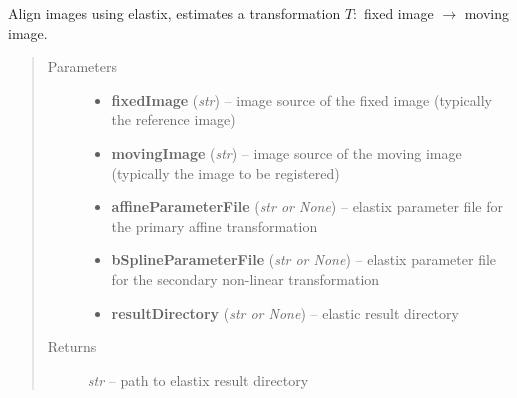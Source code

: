 \documentclass[letterpaper,10pt,english]{sphinxmanual}
\begin{document}
\begin{fulllineitems}
\label{api/ClearMap.Alignment:ClearMap.Alignment.Elastix.alignData}
Align images using elastix, estimates a transformation $T:$ fixed image $\rightarrow$ moving image.
\begin{quote}\begin{description}
\item[{Parameters}] \leavevmode\begin{itemize}
\item {} 
\textbf{fixedImage} (\emph{str}) --
image source of the fixed image (typically the reference image)

\item {} 
\textbf{movingImage} (\emph{str}) --
image source of the moving image (typically the image to be registered)

\item {} 
\textbf{affineParameterFile} (\emph{str or None}) --
elastix parameter file for the primary affine transformation

\item {} 
\textbf{bSplineParameterFile} (\emph{str or None}) --
elastix parameter file for the secondary non-linear transformation

\item {} 
\textbf{resultDirectory} (\emph{str or None}) --
elastic result directory

\end{itemize}

\item[{Returns}] \leavevmode
\emph{str} --
path to elastix result directory

\end{description}\end{quote}

\end{fulllineitems}

\end{document}

